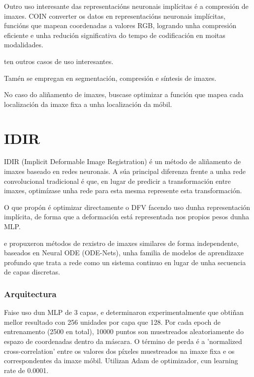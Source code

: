 Outro uso interesante das representacións neuronais implícitas é a compresión de imaxes. COIN \cite{coin} converter os datos en representacións neuronais implícitas, funcións que mapean coordenadas a valores RGB, logrando unha compresión eficiente e unha redución significativa do tempo de codificación en moitas modalidades.

\cite{velikova2024implicitneuralrepresentationsbreathingcompensated} ten outros casos de uso interesantes.

Tamén se empregan en segmentación, compresión e síntesis de imaxes.

No caso do aliñamento de imaxes, buscase optimizar a función que mapea cada localización da imaxe fixa a unha localización da móbil.

\section{IDIR}
\label{sec:IDIR}
IDIR (Implicit Deformable Image Registration) é un método de aliñamento de imaxes baseado en redes neuronais. 
A súa principal diferenza frente a unha rede convolucional tradicional é que, 
en lugar de predicir a transformación entre imaxes, optimízase unha rede para esta mesma represente esta transformación.

O que \cite{wolterink2021implicit} propón é optimizar directamente o DFV facendo uso
 dunha representación implícita, de forma que a deformación está representada nos propios pesos dunha MLP.

 \cite{sun2024medicalimageregistrationneural} e \cite{nodeo} propuxeron métodos de rexistro de imaxes similares de forma independente,
 baseados en Neural ODE (ODE-Nets)\cite{neuralode}, unha familia de modelos de aprendizaxe profundo que trata a rede como un sistema continuo en lugar de unha secuencia de capas discretas.


\subsubsection{Arquitectura}
\label{subsubsec:Arquitectura}

Faise uso dun MLP de 3 capas, e determinaron experimentalmente que obtiñan mellor resultado con 256 unidades por capa que 128.
Por cada epoch de entrenamento (2500 en total), 10000 puntos son muestreados aleatoriamente do espazo de coordenadas dentro da máscara.
O término de perda é a 'normalized cross-correlation' entre os valores dos píxeles muestreados na imaxe fixa e os correspondentes da imaxe móbil.
Utilizan Adam de optimizador, cun learning rate de 0.0001.

